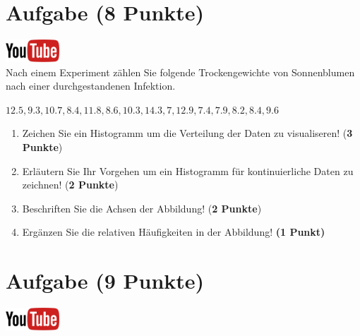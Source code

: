 \documentclass[a4paper, 10pt]{scrartcl}\usepackage[]{graphicx}\usepackage[]{xcolor}
\begin{document}
\section{Aufgabe \hfill (8 Punkte)}

\hfill\href{https://youtu.be/ORHSPTCdfeY}{\includegraphics[width =
  2cm]{img/youtube}}\\[1Ex]



Nach einem Experiment z{\"a}hlen Sie folgende Trockengewichte von Sonnenblumen nach einer durchgestandenen Infektion. 

\begin{center}
$12.5, 9.3, 10.7, 8.4, 11.8, 8.6, 10.3, 14.3, 7, 12.9, 7.4, 7.9, 8.2, 8.4, 9.6$
\end{center}

\begin{enumerate}
\item Zeichen Sie ein Histogramm um die Verteilung der Daten zu
  visualiseren! (\textbf{3 Punkte})
 \item Erl{\"a}utern Sie Ihr Vorgehen um ein Histogramm f{\"u}r kontinuierliche
  Daten zu zeichnen!  (\textbf{2 Punkte})
\item Beschriften Sie die Achsen der Abbildung! (\textbf{2 Punkte})
\item Erg{\"a}nzen Sie die relativen H{\"a}ufigkeiten in der Abbildung! \textbf{(1
    Punkt)}  
\end{enumerate}

 
\clearpage

\section{Aufgabe \hfill (9 Punkte)}

\hfill\href{https://youtu.be/0xc0jIPeiyw}{\includegraphics[width =
  2cm]{img/youtube}}\\[1Ex]
\end{document}
